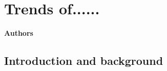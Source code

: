 \chapter[Trends]{Trends of......}
\label{ch:XXX}

{\bf{Authors}}\\


\section{\label{sec:Trends_introduction}Introduction and background}

\clearpage
\renewcommand\bibname{References}      %


